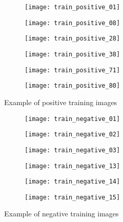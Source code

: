 \begin{figure}[H]
  \begin{subfigure}[t]{1.5in}
    \texttt{[image: train\_positive\_01]}
  \end{subfigure}
  \hfill
  \begin{subfigure}[t]{1.5in}
    \texttt{[image: train\_positive\_08]}
  \end{subfigure}
  \hfill
  \begin{subfigure}[t]{1.5in}
    \texttt{[image: train\_positive\_28]}
  \end{subfigure}
  \par\bigskip
  \begin{subfigure}[t]{1.5in}
    \texttt{[image: train\_positive\_38]}
  \end{subfigure}
  \hfill
  \begin{subfigure}[t]{1.5in}
    \texttt{[image: train\_positive\_71]}
  \end{subfigure}
  \hfill
  \begin{subfigure}[t]{1.5in}
    \texttt{[image: train\_positive\_80]}
  \end{subfigure}
  \caption{Example of positive training images}
  \label{fig:train-positive}
\end{figure}

\begin{figure}[H]
  \begin{subfigure}[t]{1.5in}
    \texttt{[image: train\_negative\_01]}
  \end{subfigure}
  \hfill
  \begin{subfigure}[t]{1.5in}
    \texttt{[image: train\_negative\_02]}
  \end{subfigure}
  \hfill
  \begin{subfigure}[t]{1.5in}
    \texttt{[image: train\_negative\_03]}
  \end{subfigure}
  \par\smallskip
  \begin{subfigure}[t]{1.5in}
    \texttt{[image: train\_negative\_13]}
  \end{subfigure}
  \hfill
  \begin{subfigure}[t]{1.5in}
    \texttt{[image: train\_negative\_14]}
  \end{subfigure}
  \hfill
  \begin{subfigure}[t]{1.5in}
    \texttt{[image: train\_negative\_15]}
  \end{subfigure}
  \caption{Example of negative training images}
  \label{fig:train-negative}
\end{figure}

